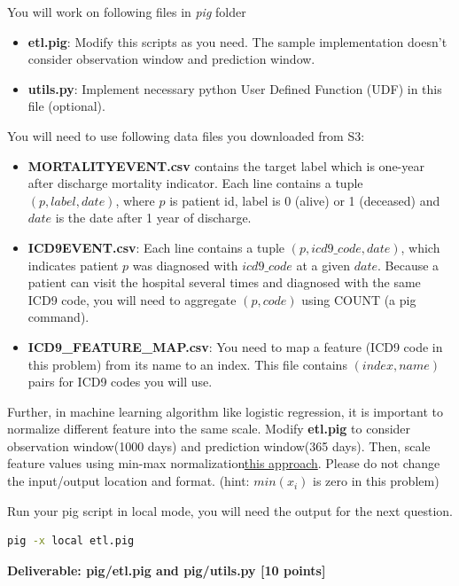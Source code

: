\documentclass[12pt]{article}
\begin{document}
You will work on following files in \textit{pig} folder
\begin{itemize}
\item \textbf{etl.pig}: Modify this scripts as you need. The sample implementation doesn't consider observation window and prediction window.
\item \textbf{utils.py}: Implement necessary python User Defined Function (UDF) in this file (optional).
\end{itemize}

You will need to use following data files you downloaded from S3:
\begin{itemize}
\item \textbf{MORTALITYEVENT.csv} contains the target label which is one-year after discharge mortality indicator. Each line contains a tuple $(p, label, date)$, 
where $p$ is patient id, label is 0 (alive) or 1 (deceased) and $date$ is the date after 1 year of discharge. 

\item \textbf{ICD9EVENT.csv}: Each line contains a tuple $(p, icd9\_code, date)$, which indicates patient $p$ was diagnosed with $icd9\_code$ at a given $date$. Because a patient can visit the hospital several times and diagnosed with the same ICD9 code, you will need to aggregate $(p, code)$ using COUNT (a pig command).
\item \textbf{ICD9\_FEATURE\_MAP.csv}: You need to map a feature (ICD9 code in this problem)  from its name to an index. This file contains $(index, name)$ pairs for ICD9 codes you will use.
\end{itemize}

Further, in machine learning algorithm like logistic regression, it is important to normalize different feature into the same scale. Modify \textbf{etl.pig} to consider observation window(1000 days) and prediction window(365 days). Then, scale feature values using min-max normalization\href{http://stats.stackexchange.com/questions/70801/how-to-normalize-data-to-0-1-range}{this approach}. Please do not change the input/output location and format. (hint: $min(x_i)$ is zero in this problem)

Run your pig script in local mode, you will need the output for the next question.
\begin{lstlisting}[frame=single,language=bash]
pig -x local etl.pig
\end{lstlisting}
\textbf{Deliverable: pig/etl.pig and pig/utils.py [10 points]}
\end{document}
